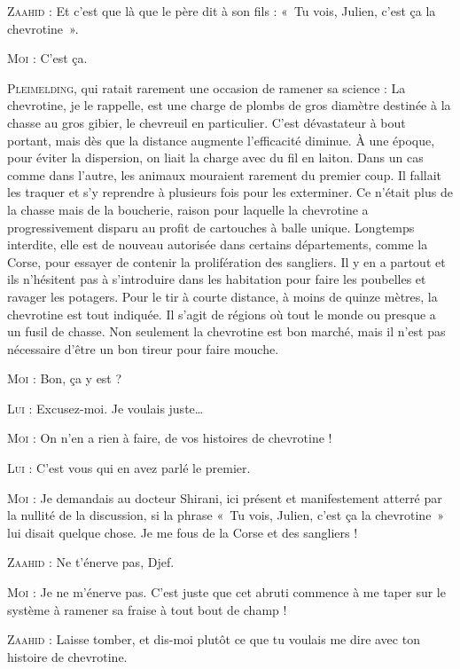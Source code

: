 \begin{dialogue}

\textsc{Zaahid} : Et c’est que là que le père dit à son fils : «~Tu vois, Julien, c’est ça la chevrotine~».

\textsc{Moi} : C’est ça.

\textsc{Pleimelding}, qui ratait rarement une occasion de ramener sa science : La chevrotine, je le rappelle, est une charge de plombs de gros diamètre destinée à la chasse au gros gibier, le chevreuil en particulier. C’est dévastateur à bout portant, mais dès que la distance augmente l’efficacité diminue. À une époque, pour éviter la dispersion, on liait la charge avec du fil en laiton. Dans un cas comme dans l’autre, les animaux mouraient rarement du premier coup. Il fallait les traquer et s’y reprendre à plusieurs fois pour les exterminer. Ce n’était plus de la chasse mais de la boucherie, raison pour laquelle la chevrotine a progressivement disparu au profit de cartouches à balle unique. Longtemps interdite, elle est de nouveau autorisée dans certains départements, comme la Corse, pour essayer de contenir la prolifération des sangliers. Il y en a partout et ils n’hésitent pas à s’introduire dans les habitation pour faire les poubelles et ravager les potagers. Pour le tir à courte distance, à moins de quinze mètres, la chevrotine est tout indiquée. Il s’agit de régions où tout le monde ou presque a un fusil de chasse. Non seulement la chevrotine est bon marché, mais il n’est pas nécessaire d’être un bon tireur pour faire mouche.

\textsc{Moi} : Bon, ça y est ?

\textsc{Lui} : Excusez-moi. Je voulais juste…

\textsc{Moi} : On n’en a rien à faire, de vos histoires de chevrotine !

\textsc{Lui} : C’est vous qui en avez parlé le premier.

\textsc{Moi} : Je demandais au docteur Shirani, ici présent et manifestement atterré par la nullité de la discussion, si la phrase «~Tu vois, Julien, c’est ça la chevrotine~» lui disait quelque chose. Je me fous de la Corse et des sangliers !

\textsc{Zaahid} : Ne t’énerve pas, Djef.

\textsc{Moi} : Je ne m’énerve pas. C’est juste que cet abruti commence à me taper sur le système à ramener sa fraise à tout bout de champ !

\textsc{Zaahid} : Laisse tomber, et dis-moi plutôt ce que tu voulais me dire avec ton histoire de chevrotine.


\end{dialogue}
